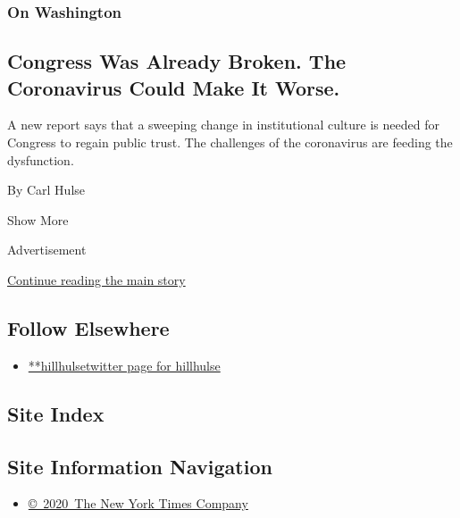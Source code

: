 \begin{enumerate}
  \hypertarget{on-washington}{%
  \subsubsection{On Washington}\label{on-washington}}

  \hypertarget{congress-was-already-broken-the-coronavirus-could-make-it-worse}{%
  \subsection{Congress Was Already Broken. The Coronavirus Could Make It
  Worse.}\label{congress-was-already-broken-the-coronavirus-could-make-it-worse}}

  A new report says that a sweeping change in institutional culture is
  needed for Congress to regain public trust. The challenges of the
  coronavirus are feeding the dysfunction.

  By Carl Hulse
\end{enumerate}

Show More

Advertisement

\protect\hyperlink{after-mid2}{Continue reading the main story}

\hypertarget{follow-elsewhere}{%
\subsection{Follow Elsewhere}\label{follow-elsewhere}}

\begin{itemize}
\tightlist
\item
  \href{https://twitter.com/hillhulse}{**hillhulsetwitter page for
  hillhulse}
\end{itemize}

\hypertarget{site-index}{%
\subsection{Site Index}\label{site-index}}

\hypertarget{site-information-navigation}{%
\subsection{Site Information
Navigation}\label{site-information-navigation}}

\begin{itemize}
\tightlist
\item
  \href{https://help.nytimes3xbfgragh.onion/hc/en-us/articles/115014792127-Copyright-notice}{©~2020~The
  New York Times Company}
\end{itemize}


